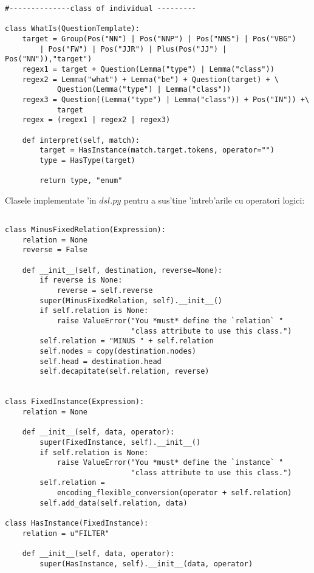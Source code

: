 \begin{verbatim}
#--------------class of individual ---------

class WhatIs(QuestionTemplate):
    target = Group(Pos("NN") | Pos("NNP") | Pos("NNS") | Pos("VBG") 
        | Pos("FW") | Pos("JJR") | Plus(Pos("JJ") | Pos("NN")),"target")
    regex1 = target + Question(Lemma("type") | Lemma("class"))
    regex2 = Lemma("what") + Lemma("be") + Question(target) + \ 
            Question(Lemma("type") | Lemma("class"))
    regex3 = Question((Lemma("type") | Lemma("class")) + Pos("IN")) +\ 
            target
    regex = (regex1 | regex2 | regex3)

    def interpret(self, match):
        target = HasInstance(match.target.tokens, operator="")
        type = HasType(target)

        return type, "enum"
\end{verbatim}

Clasele implementate 'in $dsl.py$ pentru a sus'tine 'intreb'arile cu operatori logici:

\begin{verbatim}

class MinusFixedRelation(Expression):
    relation = None
    reverse = False

    def __init__(self, destination, reverse=None):
        if reverse is None:
            reverse = self.reverse
        super(MinusFixedRelation, self).__init__()
        if self.relation is None:
            raise ValueError("You *must* define the `relation` "
                             "class attribute to use this class.")
        self.relation = "MINUS " + self.relation
        self.nodes = copy(destination.nodes)
        self.head = destination.head
        self.decapitate(self.relation, reverse)


class FixedInstance(Expression):
    relation = None

    def __init__(self, data, operator):
        super(FixedInstance, self).__init__()
        if self.relation is None:
            raise ValueError("You *must* define the `instance` "
                             "class attribute to use this class.")
        self.relation = 
            encoding_flexible_conversion(operator + self.relation)
        self.add_data(self.relation, data)

class HasInstance(FixedInstance):
    relation = u"FILTER"

    def __init__(self, data, operator):
        super(HasInstance, self).__init__(data, operator)

\end{verbatim}

